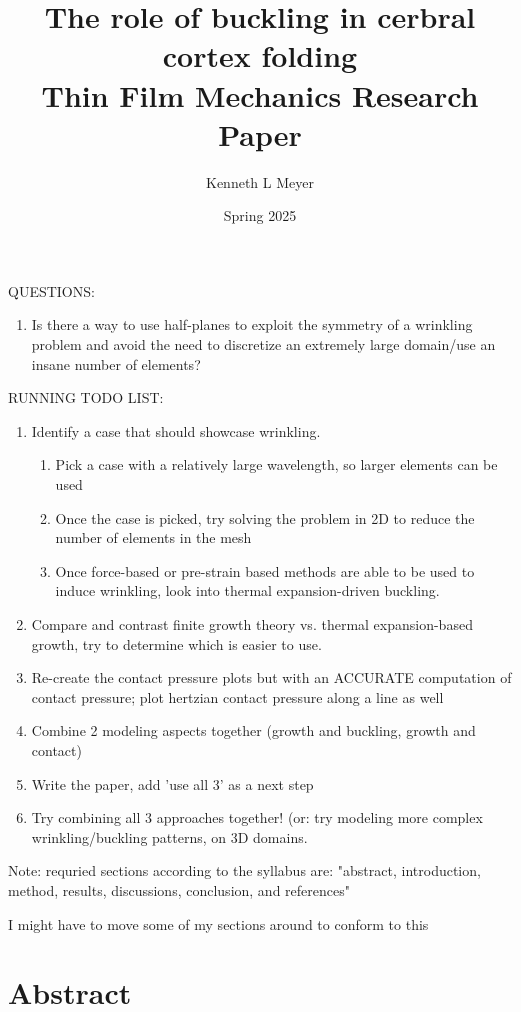 \documentclass{article}
\title{%
  The role of buckling in cerbral cortex folding \\
  \large Thin Film Mechanics Research Paper}
\author{Kenneth L  Meyer}
\date{Spring 2025}
\begin{document}
\maketitle

QUESTIONS:
\begin{enumerate}
    \item Is there a way to use half-planes to exploit the symmetry of a wrinkling problem and avoid the need to discretize an extremely large domain/use an insane number of elements?
\end{enumerate}

RUNNING TODO LIST:
\begin{enumerate}
    \item Identify a case that should showcase wrinkling.
    \begin{enumerate}
        \item Pick a case with a relatively large wavelength, so larger elements can be used
        \item Once the case is picked, try solving the problem in 2D to reduce the number of elements in the mesh
        \item Once force-based or pre-strain based methods are able to be used to induce wrinkling, look into thermal expansion-driven buckling.
    \end{enumerate}
    \item Compare and contrast finite growth theory vs. thermal expansion-based growth, try to determine which is easier to use.
    \item Re-create the contact pressure plots but with an ACCURATE computation of contact pressure; plot hertzian contact pressure along a line as well
    \item Combine 2 modeling aspects together (growth and buckling, growth and contact)
    \item Write the paper, add 'use all 3' as a next step
    \item Try combining all 3 approaches together! (or: try modeling more complex wrinkling/buckling patterns, on 3D domains. 
\end{enumerate}

Note: requried sections according to the syllabus are: "abstract, introduction, method, results, discussions, conclusion, and references"

I might have to move some of my sections around to conform to this
\tableofcontents

\section{Abstract}
\end{document}
